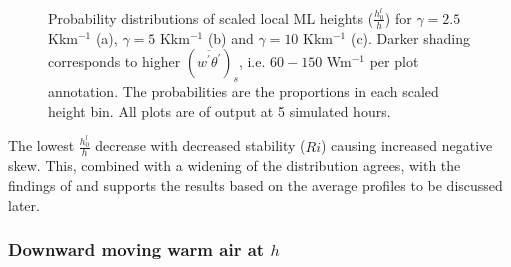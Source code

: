 \documentclass[referee]{svjour3}
\begin{document}
\begin{figure}[htbp]
\quad
\begin{center}
        \\      
\end{center}       

        \caption[Local Scaled ML Height Distributions]{Probability distributions of scaled local ML heights ($\frac{h^{l}_{0}}{h}$) for $\gamma = 2.5$ Kkm$^{-1}$ (a), $\gamma = 5$ Kkm$^{-1}$ (b) and $\gamma = 10$ Kkm$^{-1}$ (c). Darker shading corresponds to higher $(\overline{w^{'}\theta^{'}})_{s}$, i.e. $60 - 150$ Wm$^{-1}$ per plot annotation.  The probabilities are the proportions in each scaled height bin. All plots are of output at 5 simulated hours.}
    
        \label{fig:localhdist}
\end{figure}

The lowest $\frac{h^{l}_{0}}{h}$ decrease with decreased stability ($Ri$) causing increased negative skew. This, combined with a widening of the distribution agrees, with the findings of \cite{SullMoengStev} and supports the results based on the average profiles to be discussed later. \\  

\subsubsection{Downward moving warm air at $h$}
\label{subsubsec:downwarm}
\end{document}
